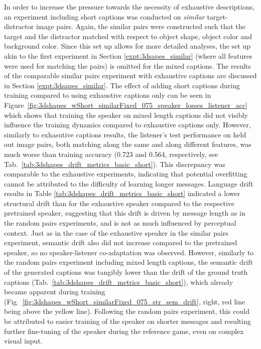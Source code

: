 In order to increase the pressure towards the necessity of exhaustive descriptions, an experiment including short captions was conducted on \emph{similar} target-distractor image pairs. Again, the similar pairs were constructed such that the target and the distractor matched with respect to object shape, object color and background color. Since this set up allows for more detailed analyses, the set up akin to the first experiment in Section \ref{expt:3dsapes_similar} (where all features were used for matching the pairs) is omitted for the mixed captions. The results of the comparable similar pairs experiment with exhaustive captions are discussed in Section \ref{expt:3dsapes_similar}. The effect of adding short captions during training compared to using exhaustive captions only can be seen in Figure~\ref{fig:3dshapes_wShort_similarFixed_075_speaker_losses_listener_acc} which shows that training the speaker on mixed length captions did not visibly influence the training dynamics compared to exhaustive captions only. However, similarly to exhasutive captions results, the listener's test performance on held out image pairs, both matching along the same and along different features, was much worse than training accuracy (0.723 and 0.564, respectively, see Tab.~\ref{tab:3dshapes_drift_metrics_basic_short}). This discrepancy was comparable to the exhaustive experiments, indicating that potential overfitting cannot be attributed to the difficulty of learning longer messages. Language drift results in Table \ref{tab:3dshapes_drift_metrics_basic_short} indicated a lower structural drift than for the exhaustive speaker compared to the respective pretrained speaker, suggesting that this drift is driven by message length as in the random pairs experiments, and is not as much influenced by perceptual context. Just as in the case of the exhaustive speaker in the similar pairs experiment, semantic drift also did not increase compared to the pretrained speaker, so no speaker-listener co-adaptation was observed. However, similarly to the random pairs experiment including mixed length captions, the semantic drift of the generated captions was tangibly lower than the drift of the ground truth captions (Tab.~\ref{tab:3dshapes_drift_metrics_basic_short}), which already became apparent during training (Fig.~\ref{fig:3dshapes_wShort_similarFixed_075_str_sem_drift}, right, red line being above the yellow line). Following the random pairs experiment, this could be attributed to easier training of the speaker on shorter messages and resulting further fine-tuning of the speaker during the reference game, even on complex visual input. 


